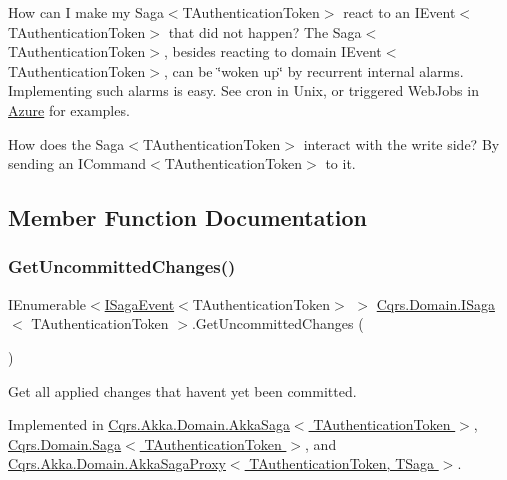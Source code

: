 How can I make my Saga$<$\+T\+Authentication\+Token$>$ react to an I\+Event$<$\+T\+Authentication\+Token$>$ that did not happen? The Saga$<$\+T\+Authentication\+Token$>$, besides reacting to domain I\+Event$<$\+T\+Authentication\+Token$>$, can be \char`\"{}woken up\char`\"{} by recurrent internal alarms. Implementing such alarms is easy. See cron in Unix, or triggered Web\+Jobs in \hyperlink{namespaceCqrs_1_1Azure}{Azure} for examples.

How does the Saga$<$\+T\+Authentication\+Token$>$ interact with the write side? By sending an I\+Command$<$\+T\+Authentication\+Token$>$ to it. 

\subsection{Member Function Documentation}
\mbox{\label{interfaceCqrs_1_1Domain_1_1ISaga_abb77811b4f7d19adb61f9d33da18e7e0_abb77811b4f7d19adb61f9d33da18e7e0}} 
\subsubsection{\texorpdfstring{Get\+Uncommitted\+Changes()}{GetUncommittedChanges()}}
{\footnotesize\ttfamily I\+Enumerable$<$\hyperlink{interfaceCqrs_1_1Events_1_1ISagaEvent}{I\+Saga\+Event}$<$T\+Authentication\+Token$>$ $>$ \hyperlink{interfaceCqrs_1_1Domain_1_1ISaga}{Cqrs.\+Domain.\+I\+Saga}$<$ T\+Authentication\+Token $>$.Get\+Uncommitted\+Changes (\begin{DoxyParamCaption}{ }\end{DoxyParamCaption})}



Get all applied changes that haven\textquotesingle{}t yet been committed. 



Implemented in \hyperlink{classCqrs_1_1Akka_1_1Domain_1_1AkkaSaga_ac88061e29e3e2223db31ce9075835b46_ac88061e29e3e2223db31ce9075835b46}{Cqrs.\+Akka.\+Domain.\+Akka\+Saga$<$ T\+Authentication\+Token $>$}, \hyperlink{classCqrs_1_1Domain_1_1Saga_a759b30b518c7fa5037ec4041054f349c_a759b30b518c7fa5037ec4041054f349c}{Cqrs.\+Domain.\+Saga$<$ T\+Authentication\+Token $>$}, and \hyperlink{classCqrs_1_1Akka_1_1Domain_1_1AkkaSagaProxy_a8cad3415bc5474a01bfdb2db3a852ea5_a8cad3415bc5474a01bfdb2db3a852ea5}{Cqrs.\+Akka.\+Domain.\+Akka\+Saga\+Proxy$<$ T\+Authentication\+Token, T\+Saga $>$}.

